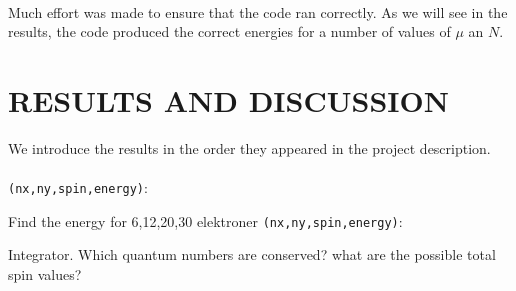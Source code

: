 \documentclass[11pt,english,a4paper]{article}
\begin{document}
\\
Much effort was made to ensure that the code ran correctly. As we will see in the results, the code produced the correct energies for a number of values of $\mu$ an $N$.

\section*{\uppercase{Results and discussion}}
We introduce the results in the order they appeared in the project description.\\
\\
\texttt{(nx,ny,spin,energy)}:

Find the energy for 6,12,20,30 elektroner
\texttt{(nx,ny,spin,energy)}:


Integrator. Which quantum numbers are conserved? what are the possible total spin values?
\end{document}
